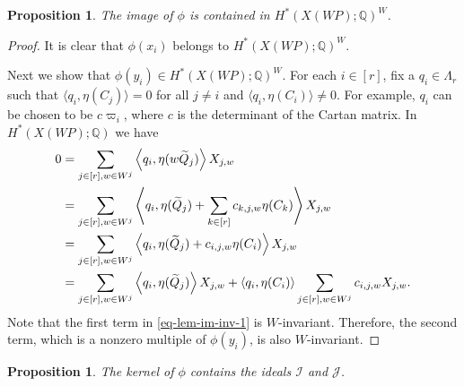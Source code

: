 \documentclass{amsart}
\newtheorem{proposition}[theorem]{Proposition}
\theoremstyle{definition}
\theoremstyle{remark}
\numberwithin{equation}{section}
\begin{document}
\begin{proposition} \label{lem-im-inv}
    The image of $\phi$ is contained in $H^*\left(X(\mathit{WP}) ; \mathbb{Q}\right)^W$.
\end{proposition}

\begin{proof}
    It is clear that $\phi(x_i)$ belongs to $H^*\left(X(\mathit{WP}) ; \mathbb{Q}\right)^W$.

    Next we show that $\phi(y_i) \in H^*\left(X(\mathit{WP}) ; \mathbb{Q}\right)^W$.
    For each $i \in [r]$, fix a $q_i \in \Lambda_r$ such that $\langle q_i, \eta(C_j)\rangle = 0$ for all $j \ne i$ and $\langle q_i, \eta(C_i) \rangle \ne 0$. 
    For example, $q_i$ can be chosen to be $c \varpi_i$, where $c$ is the determinant of the Cartan matrix.
    In $H^*\left(X(\mathit{WP}) ; \mathbb{Q}\right)$ we have
    \begin{align}
        0 & = \sum_{j \in [r], w \in W^j} \left\langle q_i, \eta(w \widetilde{Q}_j) \right\rangle X_{j,w} \notag \\
        & = \sum_{j \in [r], w \in W^j} \left\langle q_i, \eta(\widetilde{Q}_j) + \sum_{k \in [r]} c_{k,j,w} \eta(C_k) \right\rangle X_{j,w} \notag \\
        & = \sum_{j \in [r], w \in W^j} \left\langle q_i, \eta(\widetilde{Q}_j) +  c_{i,j,w} \eta(C_i) \right\rangle X_{j,w} \notag \\
        & = \sum_{j \in [r], w \in W^j} \left\langle q_i, \eta(\widetilde{Q}_j) \right\rangle X_{j,w} + \left\langle q_i,  \eta(C_i) \right\rangle\sum_{j \in [r], w \in W^j} c_{i,j,w} X_{j,w}. \label{eq-lem-im-inv-1}
    \end{align}
    Note that the first term in \eqref{eq-lem-im-inv-1} is $W$-invariant. 
    Therefore, the second term, which is a nonzero multiple of $\phi(y_i)$, is also $W$-invariant. 
\end{proof}

\begin{proposition} \label{lem-ker-IJ}
    The kernel of $\phi$ contains the ideals $\mathcal{I}$ and $\mathcal{J}$.
\end{proposition}
\end{document}
